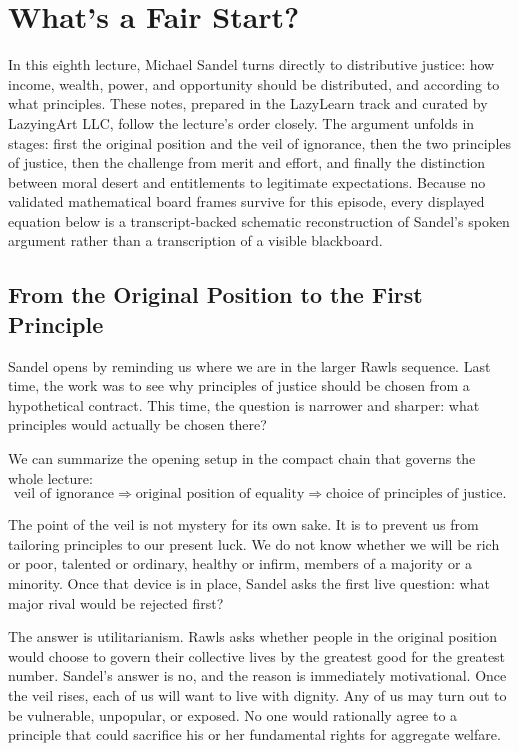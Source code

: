 \chapter{What's a Fair Start?}

In this eighth lecture, Michael Sandel turns directly to distributive justice: how income, wealth, power, and opportunity should be distributed, and according to what principles. These notes, prepared in the LazyLearn track and curated by LazyingArt LLC, follow the lecture's order closely. The argument unfolds in stages: first the original position and the veil of ignorance, then the two principles of justice, then the challenge from merit and effort, and finally the distinction between moral desert and entitlements to legitimate expectations. Because no validated mathematical board frames survive for this episode, every displayed equation below is a transcript-backed schematic reconstruction of Sandel's spoken argument rather than a transcription of a visible blackboard.

\section{From the Original Position to the First Principle}

Sandel opens by reminding us where we are in the larger Rawls sequence. Last time, the work was to see why principles of justice should be chosen from a hypothetical contract. This time, the question is narrower and sharper: what principles would actually be chosen there?

We can summarize the opening setup in the compact chain that governs the whole lecture:
\begin{equation}
\text{veil of ignorance}
\Longrightarrow
\text{original position of equality}
\Longrightarrow
\text{choice of principles of justice}.
\end{equation}

The point of the veil is not mystery for its own sake. It is to prevent us from tailoring principles to our present luck. We do not know whether we will be rich or poor, talented or ordinary, healthy or infirm, members of a majority or a minority. Once that device is in place, Sandel asks the first live question: what major rival would be rejected first?

The answer is utilitarianism. Rawls asks whether people in the original position would choose to govern their collective lives by the greatest good for the greatest number. Sandel's answer is no, and the reason is immediately motivational. Once the veil rises, each of us will want to live with dignity. Any of us may turn out to be vulnerable, unpopular, or exposed. No one would rationally agree to a principle that could sacrifice his or her fundamental rights for aggregate welfare.

